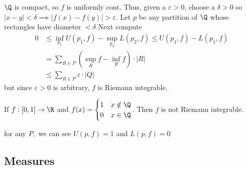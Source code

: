 \begin{solution}
	$\Q$ is compact, so  $f$ is uniformly cont. Thus, given a $\varepsilon >0 $, choose a $\delta >0$ so  $|x-y| < \delta \implies |f(x) - f(y)| > \varepsilon$. Let $p$ be any partition of  $\Q$ whose rectangles have diameter  $< \delta$ \newline
	Next compute
	\begin{align*}
		0 &\leq \inf_{p_1} U(p_1, f) - \sup_{p_2} L(p_2, f) \leq U(p_1, f) - L(p_1, f) \\
		  &= \sum_{R \in P}^{} \left( \sup_{R} f - \inf_{R}f \right) \cdot |R| \\
		  &\leq \sum_{R \in P}^{} \varepsilon \cdot |Q|
	\end{align*}
	but since $\varepsilon > 0$ is arbitrary,  $f$ is Riemann integrable.
\end{solution}

\begin{example}
	If $f:[0,1] \to \R$ and $f(x) =
	\begin{cases}
		1 & x\notin \Q \\
		0 & x\in \Q
	\end{cases}$.
	Then $f$ is not Riemann integrable. \\
	\begin{solution}
		for any $P,$ we can see  $U(p,f) = 1$ and  $L(p,f) = 0$
	\end{solution}
\end{example}

\subsection{Measures}


